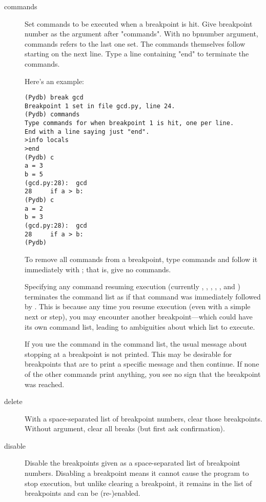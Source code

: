 \begin{description}
\item[commands ]

Set commands to be executed when a breakpoint is hit.
Give breakpoint number as the argument after "commands".
With no bpnumber argument, commands refers to the last one set.
The commands themselves follow starting on the next line.
Type a line containing "end" to terminate the commands.

Here's an example:

\begin{verbatim}
(Pydb) break gcd
Breakpoint 1 set in file gcd.py, line 24.
(Pydb) commands
Type commands for when breakpoint 1 is hit, one per line.
End with a line saying just "end".
>info locals
>end
(Pydb) c
a = 3
b = 5
(gcd.py:28):  gcd
28     if a > b:
(Pydb) c
a = 2
b = 3
(gcd.py:28):  gcd
28     if a > b:
(Pydb) 
\end{verbatim}

To remove all commands from a breakpoint, type commands and
follow it immediately with ; that is, give no commands.

Specifying any command resuming execution (currently ,
, , , , and )
terminates the command list as if that command was immediately
followed by .  This is because any time you resume execution
(even with a simple next or step), you may encounter another
breakpoint---which could have its own command list, leading to
ambiguities about which list to execute.

If you use the  command in the command list, the
usual message about stopping at a breakpoint is not printed.
This may be desirable for breakpoints that are to print a
specific message and then continue.  If none of the other
commands print anything, you see no sign that the breakpoint
was reached.

\item[delete ]

With a space-separated list of breakpoint numbers, clear those
breakpoints.  Without argument, clear all breaks (but first
ask confirmation).

\item[disable ]

Disable the breakpoints given as a space-separated list of
breakpoint numbers.  Disabling a breakpoint means it cannot cause
the program to stop execution, but unlike clearing a breakpoint, it
remains in the list of breakpoints and can be (re-)enabled.


\end{description}
